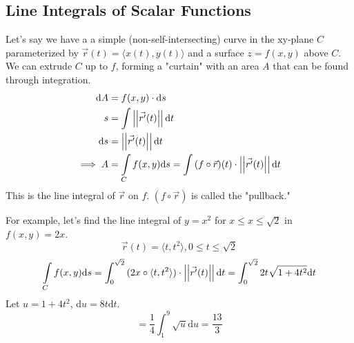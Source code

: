 \subsection{Line Integrals of Scalar Functions}
\noindent
Let's say we have a a simple (non-self-intersecting) curve in the xy-plane $C$ parameterized by $\vec{r}(t) = \langle x(t), y(t)\rangle$ and a surface $z = f(x,y)$ above $C$. We can extrude $C$ up to $f$, forming a "curtain" with an area $A$ that can be found through integration.
\begin{align*}
	\mathrm{d}A &= f(x,y) \cdot \mathrm{d}s	\\
	s &= \int{\left|\left|\vec{r^\prime}(t)\right|\right|\mathrm{d}t} \\
	\mathrm{d}s &= \left|\left|\vec{r'}(t)\right|\right|\mathrm{d}t \\
	\implies A &= \int\limits_{C}{f(x,y)\mathrm{d}s} = \int{(f\circ\vec{r})(t) \cdot \left|\left|\vec{r^\prime}(t)\right|\right|\mathrm{d}t}
\end{align*}
This is the line integral of $\vec{r}$ on $f$. $(f\circ\vec{r})$ is called the "pullback."

\noindent
For example, let's find the line integral of $y = x^2$ for $x \leq x \leq \sqrt{2}$ in $f(x,y) = 2x$.
\begin{equation*}
	\vec{r}(t) = \langle t, t^2 \rangle, 0 \leq t \leq \sqrt{2}	
\end{equation*}
\begin{equation*}
	\int\limits_{C}{f(x,y)\mathrm{d}s} = \int_{0}^{\sqrt{2}}{(2x \circ \langle t, t^2\rangle) \cdot \left|\left|\vec{r^\prime}(t)\right|\right|\mathrm{d}t} = \int_{0}^{\sqrt{2}}{2t\sqrt{1 + 4t^2}\mathrm{d}t}
\end{equation*}
Let $u = 1+4t^2$, $\mathrm{d}u = 8t\mathrm{d}t$.
\begin{equation*}
	= \frac{1}{4}\int_{1}^{9}{\sqrt{u}\mathrm{d}u} = \frac{13}{3}
\end{equation*}